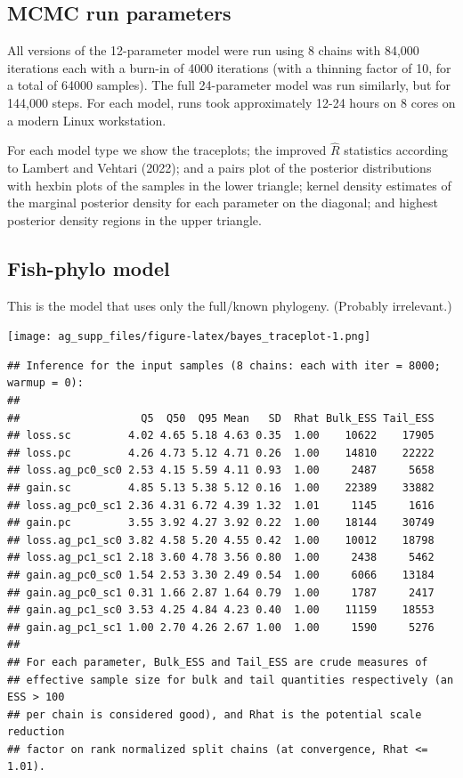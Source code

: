 \documentclass[
]{article}
\begin{document}
\hypertarget{mcmc-run-parameters}{%
\subsection{MCMC run parameters}\label{mcmc-run-parameters}}

All versions of the 12-parameter model were run using 8 chains with
84,000 iterations each with a burn-in of 4000 iterations (with a
thinning factor of 10, for a total of 64000 samples). The full
24-parameter model was run similarly, but for 144,000 steps. For each
model, runs took approximately 12-24 hours on 8 cores on a modern Linux
workstation.

For each model type we show the traceplots; the improved \(\hat R\)
statistics according to Lambert and Vehtari (2022); and a pairs plot of
the posterior distributions with hexbin plots of the samples in the
lower triangle; kernel density estimates of the marginal posterior
density for each parameter on the diagonal; and highest posterior
density regions in the upper triangle.

\hypertarget{fish-phylo-model}{%
\subsection{Fish-phylo model}\label{fish-phylo-model}}

This is the model that uses only the full/known phylogeny. (Probably
irrelevant.)

\texttt{[image: ag\_supp\_files/figure-latex/bayes\_traceplot-1.png]}

\begin{verbatim}
## Inference for the input samples (8 chains: each with iter = 8000; warmup = 0):
## 
##                   Q5  Q50  Q95 Mean   SD  Rhat Bulk_ESS Tail_ESS
## loss.sc         4.02 4.65 5.18 4.63 0.35  1.00    10622    17905
## loss.pc         4.26 4.73 5.12 4.71 0.26  1.00    14810    22222
## loss.ag_pc0_sc0 2.53 4.15 5.59 4.11 0.93  1.00     2487     5658
## gain.sc         4.85 5.13 5.38 5.12 0.16  1.00    22389    33882
## loss.ag_pc0_sc1 2.36 4.31 6.72 4.39 1.32  1.01     1145     1616
## gain.pc         3.55 3.92 4.27 3.92 0.22  1.00    18144    30749
## loss.ag_pc1_sc0 3.82 4.58 5.20 4.55 0.42  1.00    10012    18798
## loss.ag_pc1_sc1 2.18 3.60 4.78 3.56 0.80  1.00     2438     5462
## gain.ag_pc0_sc0 1.54 2.53 3.30 2.49 0.54  1.00     6066    13184
## gain.ag_pc0_sc1 0.31 1.66 2.87 1.64 0.79  1.00     1787     2417
## gain.ag_pc1_sc0 3.53 4.25 4.84 4.23 0.40  1.00    11159    18553
## gain.ag_pc1_sc1 1.00 2.70 4.26 2.67 1.00  1.00     1590     5276
## 
## For each parameter, Bulk_ESS and Tail_ESS are crude measures of 
## effective sample size for bulk and tail quantities respectively (an ESS > 100 
## per chain is considered good), and Rhat is the potential scale reduction 
## factor on rank normalized split chains (at convergence, Rhat <= 1.01).
\end{verbatim}
\end{document}
